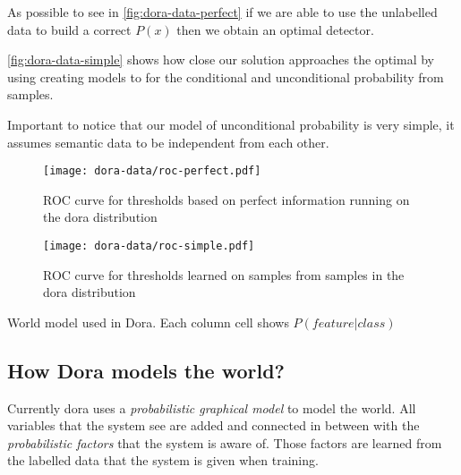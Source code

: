 \documentclass[a4paper]{article}
\begin{document}


As possible to see in \autoref{fig:dora-data-perfect} if we are able to use the unlabelled data to build a correct $P(x)$ then we obtain an optimal detector.

\autoref{fig:dora-data-simple} shows how close our solution approaches the optimal by using creating models to for the conditional and unconditional probability from samples.

Important to notice that our model of unconditional probability is very simple, it assumes semantic data to be independent from each other.


\begin{figure}
\centering
\texttt{[image: dora-data/roc-perfect.pdf]}
\caption{ROC curve for thresholds based on perfect information running on the dora distribution}
\label{fig:dora-data-perfect}
\end{figure}

\begin{figure}
\centering
\texttt{[image: dora-data/roc-simple.pdf]}
\caption{ROC curve for thresholds learned on samples from samples in the dora distribution}
\label{fig:dora-data-simple}
\end{figure}

\begin{sidewaystable}[h]
\begin{center}
\scalebox{0.35}{}
\end{center}
\caption{\label{tab:dora-world-distribution}World model used in Dora. Each column cell shows $P(feature|class)$}
\end{sidewaystable}

\subsection{How Dora models the world?}
\label{sec:dora-models}

Currently dora uses a \emph{probabilistic graphical model} to model the world.
All variables that the system see are added and connected in between with the
\emph{probabilistic factors} that the system is aware of.
Those factors are learned from the labelled data that the system is given when
training.
\end{document}

